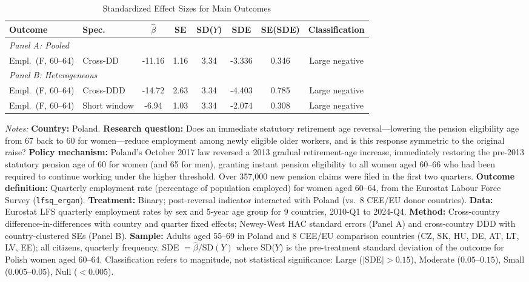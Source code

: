 \begin{table}[H]
\centering
\caption{Standardized Effect Sizes for Main Outcomes}
\label{tab:sde}
\small
\begin{tabular}{llcccccc}
\toprule
Outcome & Spec. & $\hat{\beta}$ & SE & SD($Y$) & SDE & SE(SDE) & Classification \\
\midrule
\multicolumn{8}{l}{\textit{Panel A: Pooled}} \\
Empl.\ (F, 60--64) & Cross-DD & -11.16 & 1.16 & 3.34 & -3.336 & 0.346 & Large negative \\
\midrule
\multicolumn{8}{l}{\textit{Panel B: Heterogeneous}} \\
Empl.\ (F, 60--64) & Cross-DDD & -14.72 & 2.63 & 3.34 & -4.403 & 0.785 & Large negative \\
Empl.\ (F, 60--64) & Short window & -6.94 & 1.03 & 3.34 & -2.074 & 0.308 & Large negative \\
\bottomrule
\end{tabular}
\par\vspace{0.3em}
{\footnotesize\raggedright \textit{Notes:} \textbf{Country:} Poland. \textbf{Research question:} Does an immediate statutory retirement age reversal---lowering the pension eligibility age from 67 back to 60 for women---reduce employment among newly eligible older workers, and is this response symmetric to the original raise? \textbf{Policy mechanism:} Poland's October 2017 law reversed a 2013 gradual retirement-age increase, immediately restoring the pre-2013 statutory pension age of 60 for women (and 65 for men), granting instant pension eligibility to all women aged 60--66 who had been required to continue working under the higher threshold. Over 357,000 new pension claims were filed in the first two quarters. \textbf{Outcome definition:} Quarterly employment rate (percentage of population employed) for women aged 60--64, from the Eurostat Labour Force Survey (\texttt{lfsq\_ergan}). \textbf{Treatment:} Binary; post-reversal indicator interacted with Poland (vs.\ 8 CEE/EU donor countries). \textbf{Data:} Eurostat LFS quarterly employment rates by sex and 5-year age group for 9 countries, 2010-Q1 to 2024-Q4. \textbf{Method:} Cross-country difference-in-differences with country and quarter fixed effects; Newey-West HAC standard errors (Panel A) and cross-country DDD with country-clustered SEs (Panel B). \textbf{Sample:} Adults aged 55--69 in Poland and 8 CEE/EU comparison countries (CZ, SK, HU, DE, AT, LT, LV, EE); all citizens, quarterly frequency. SDE $= \hat{\beta} / \text{SD}(Y)$ where SD($Y$) is the pre-treatment standard deviation of the outcome for Polish women aged 60--64. Classification refers to magnitude, not statistical significance: Large ($|$SDE$| > 0.15$), Moderate ($0.05$--$0.15$), Small ($0.005$--$0.05$), Null ($< 0.005$).\par}
\end{table}
